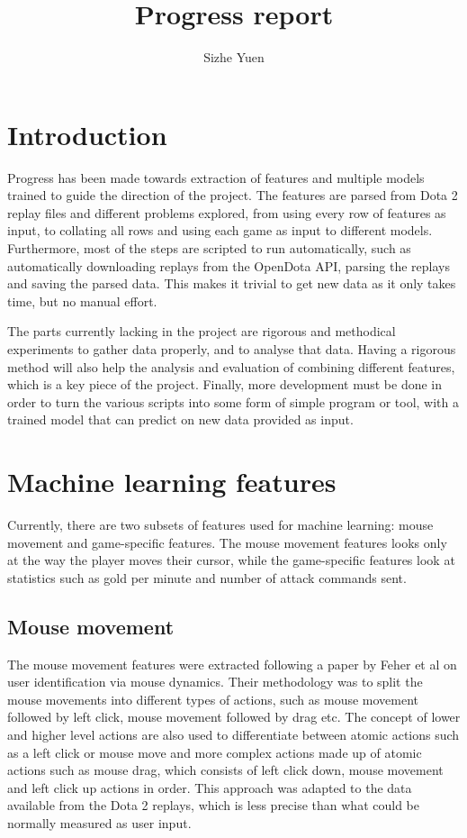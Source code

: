 \documentclass{SizheArticle}
\title{Progress report}
\author{Sizhe Yuen}
\begin{document}

\section{Introduction}
Progress has been made towards extraction of features and multiple models trained to guide the direction of the project. The features are parsed from Dota 2 replay files and different problems explored, from using every row of features as input, to collating all rows and using each game as input to different models. Furthermore, most of the steps are scripted to run automatically, such as automatically downloading replays from the OpenDota API, parsing the replays and saving the parsed data. This makes it trivial to get new data as it only takes time, but no manual effort. 

The parts currently lacking in the project are rigorous and methodical experiments to gather data properly, and to analyse that data. Having a rigorous method will also help the analysis and evaluation of combining different features, which is a key piece of the project. Finally, more development must be done in order to turn the various scripts into some form of simple program or tool, with a trained model that can predict on new data provided as input.  

\section{Machine learning features}
Currently, there are two subsets of features used for machine learning: mouse movement and game-specific features. The mouse movement features looks only at the way the player moves their cursor, while the game-specific features look at statistics such as gold per minute and number of attack commands sent. 

\subsection{Mouse movement}
The mouse movement features were extracted following a paper by Feher et al \cite{mouse-dynamics} on user identification via mouse dynamics. Their methodology was to split the mouse movements into different types of actions, such as mouse movement followed by left click, mouse movement followed by drag etc. The concept of lower and higher level actions are also used to differentiate between atomic actions such as a left click or mouse move and more complex actions made up of atomic actions such as mouse drag, which consists of left click down, mouse movement and left click up actions in order. This approach was adapted to the data available from the Dota 2 replays, which is less precise than what could be normally measured as user input. 
\end{document}

